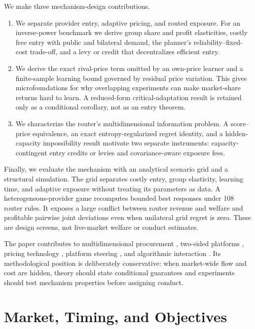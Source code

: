 \documentclass[sigconf,nonacm]{acmart}
\newcommand{\1}{\mathbf 1}
\begin{document}
We make three mechanism-design contributions.

\begin{enumerate}[leftmargin=*,nosep]
\item We separate provider entry, adaptive pricing, and routed exposure.  For an
inverse-power benchmark we derive group share and profit elasticities, costly
free entry with public and bilateral demand, the planner's reliability--fixed-
cost trade-off, and a levy or credit that decentralizes efficient entry.
\item We derive the exact rival-price term omitted by an own-price learner and a
finite-sample learning bound governed by residual price variation.  This gives
microfoundations for why overlapping experiments can make market-share returns
hard to learn.  A reduced-form critical-adaptation result is retained only as a
conditional corollary, not as an entry theorem.
\item We characterize the router's multidimensional information problem.  A
score--price equivalence, an exact entropy-regularized regret identity, and a
hidden-capacity impossibility result motivate two separate instruments:
capacity-contingent entry credits or levies and covariance-aware exposure fees.
\end{enumerate}

Finally, we evaluate the mechanism with an analytical scenario grid and a
structural simulation.  The grid separates costly entry, group elasticity,
learning time, and adaptive exposure without treating its parameters as data.  A
heterogeneous-provider game
recomputes bounded best responses under 108 router rules.  It exposes a large
conflict between router revenue and welfare and profitable pairwise joint
deviations even when unilateral grid regret is zero.  These are design screens,
not live-market welfare or conduct estimates.

The paper contributes to multidimensional procurement \cite{che1993},
two-sided platforms \cite{rochettirole2003}, pricing technology
\cite{brownmackay2023}, platform steering
\cite{johnsonrhodeswildenbeest2023}, and algorithmic interaction
\cite{hansenmisrapai2021}.  Its methodological position is deliberately
conservative: when market-wide flow and cost are hidden, theory should state
conditional guarantees and experiments should test mechanism properties before
assigning conduct.

\section{Market, Timing, and Objectives}
\label{sec:model}
\end{document}
